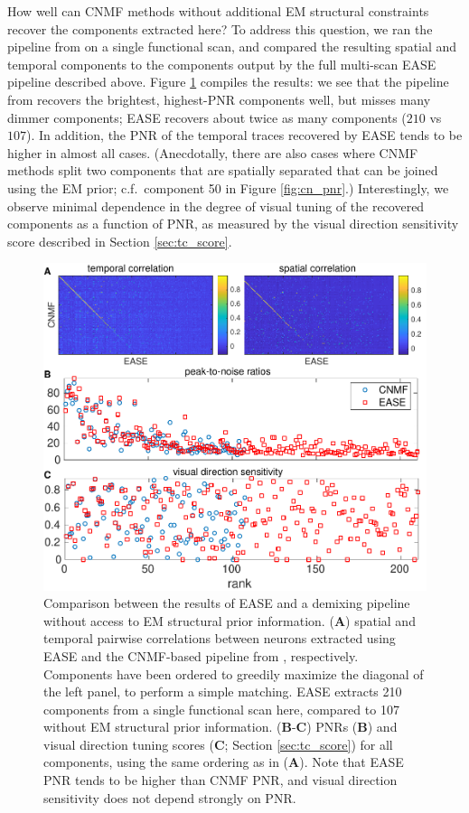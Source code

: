 \documentclass[10pt,letterpaper]{article}
\begin{document}
How well can CNMF methods without additional EM structural constraints recover the components extracted here?  To address this question, we ran the pipeline from \citep{Buchanan2018} on a single functional scan, and compared the resulting spatial and temporal components to the components output by the full multi-scan EASE pipeline described above.  Figure \ref{fig:compare} compiles the results: we see that the pipeline from \citep{Buchanan2018} recovers the brightest, highest-PNR components well, but misses many dimmer components; EASE recovers about twice as many  components ($210$ vs $107$).  In addition, the PNR of the temporal traces recovered by EASE tends to be higher in almost all cases.  (Anecdotally, there are also cases where CNMF methods split two components that are spatially separated that can be joined using the EM prior; c.f.\ component 50 in Figure \ref{fig:cn_pnr}.)  Interestingly, we observe minimal dependence in the degree of visual tuning of the recovered components as a function of PNR, as measured by the visual direction sensitivity score described in Section \ref{sec:tc_score}.

\begin{figure}[!t]
\includegraphics[width=1\textwidth]{Figs/cnmf_ease_match.pdf}
\caption{Comparison between the results of EASE and a demixing pipeline without access to EM structural prior information. (\textbf{A}) spatial and temporal pairwise correlations between neurons extracted using EASE and the CNMF-based pipeline from \citep{Buchanan2018}, respectively.  Components have been ordered to greedily maximize the diagonal of the left panel, to perform a simple matching.  EASE extracts  210 components from a single functional scan here, compared to 107 without EM structural prior information.  (\textbf{B}-\textbf{C}) PNRs (\textbf{B}) and visual direction tuning scores (\textbf{C}; Section \ref{sec:tc_score}) for all components, using the same ordering as in (\textbf{A}).  Note that EASE PNR tends to be higher than CNMF PNR, and visual direction sensitivity does not depend strongly on PNR.}
\label{fig:compare}
\end{figure}
\end{document}
